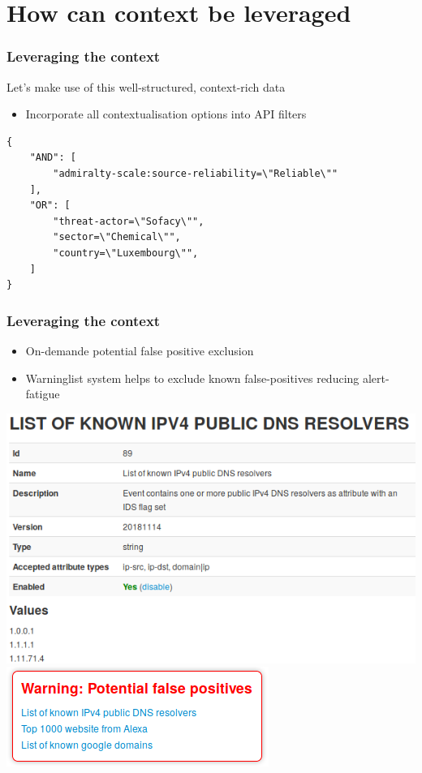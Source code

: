 \section{How can context be leveraged}
\begin{frame}[fragile]
    \frametitle{Leveraging the context}
    Let's make use of this well-structured, context-rich data
    \begin{itemize}
        \item Incorporate all contextualisation options into API filters
    \end{itemize}
\begin{lstlisting}
{
    "AND": [
        "admiralty-scale:source-reliability=\"Reliable\""
    ],
    "OR": [
        "threat-actor=\"Sofacy\"",
        "sector=\"Chemical\"",
        "country=\"Luxembourg\"",
    ]
}
\end{lstlisting}
\end{frame}

\begin{frame}
    \frametitle{Leveraging the context}
    \begin{itemize}
        \item On-demande potential false positive exclusion
        \item Warninglist system helps to exclude known false-positives reducing alert-fatigue
    \end{itemize}
    \includegraphics[width=0.66\linewidth]{pictures/warning-list.png}
    \includegraphics[width=0.33\linewidth]{pictures/warning-list-event.png}
\end{frame}

